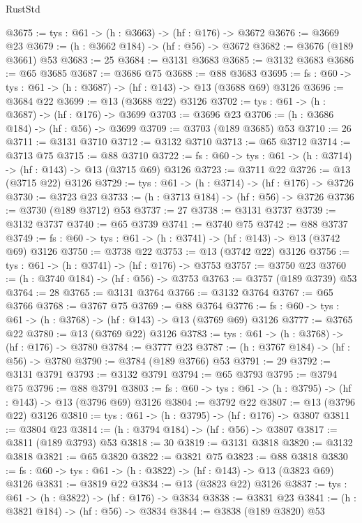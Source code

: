 \begin{lexlean}{RustStd}
\begin{coremodule}
@3675 := {tys : @61} -> (h : @3663) -> (hf : @176) -> @3672
@3676 := @3669 @23
@3679 := (h : @3662 @184) -> (hf : @56) -> @3672
@3682 := @3676 (@189 @3661) @53
@3683 := 25
@3684 := @3131 @3683
@3685 := @3132 @3683
@3686 := @65 @3685
@3687 := @3686 @75
@3688 := @88 @3683
@3695 := {fs : @60} -> {tys : @61} -> (h : @3687) -> (hf : @143) -> @13 (@3688 @69) @3126
@3696 := @3684 @22
@3699 := @13 (@3688 @22) @3126
@3702 := {tys : @61} -> (h : @3687) -> (hf : @176) -> @3699
@3703 := @3696 @23
@3706 := (h : @3686 @184) -> (hf : @56) -> @3699
@3709 := @3703 (@189 @3685) @53
@3710 := 26
@3711 := @3131 @3710
@3712 := @3132 @3710
@3713 := @65 @3712
@3714 := @3713 @75
@3715 := @88 @3710
@3722 := {fs : @60} -> {tys : @61} -> (h : @3714) -> (hf : @143) -> @13 (@3715 @69) @3126
@3723 := @3711 @22
@3726 := @13 (@3715 @22) @3126
@3729 := {tys : @61} -> (h : @3714) -> (hf : @176) -> @3726
@3730 := @3723 @23
@3733 := (h : @3713 @184) -> (hf : @56) -> @3726
@3736 := @3730 (@189 @3712) @53
@3737 := 27
@3738 := @3131 @3737
@3739 := @3132 @3737
@3740 := @65 @3739
@3741 := @3740 @75
@3742 := @88 @3737
@3749 := {fs : @60} -> {tys : @61} -> (h : @3741) -> (hf : @143) -> @13 (@3742 @69) @3126
@3750 := @3738 @22
@3753 := @13 (@3742 @22) @3126
@3756 := {tys : @61} -> (h : @3741) -> (hf : @176) -> @3753
@3757 := @3750 @23
@3760 := (h : @3740 @184) -> (hf : @56) -> @3753
@3763 := @3757 (@189 @3739) @53
@3764 := 28
@3765 := @3131 @3764
@3766 := @3132 @3764
@3767 := @65 @3766
@3768 := @3767 @75
@3769 := @88 @3764
@3776 := {fs : @60} -> {tys : @61} -> (h : @3768) -> (hf : @143) -> @13 (@3769 @69) @3126
@3777 := @3765 @22
@3780 := @13 (@3769 @22) @3126
@3783 := {tys : @61} -> (h : @3768) -> (hf : @176) -> @3780
@3784 := @3777 @23
@3787 := (h : @3767 @184) -> (hf : @56) -> @3780
@3790 := @3784 (@189 @3766) @53
@3791 := 29
@3792 := @3131 @3791
@3793 := @3132 @3791
@3794 := @65 @3793
@3795 := @3794 @75
@3796 := @88 @3791
@3803 := {fs : @60} -> {tys : @61} -> (h : @3795) -> (hf : @143) -> @13 (@3796 @69) @3126
@3804 := @3792 @22
@3807 := @13 (@3796 @22) @3126
@3810 := {tys : @61} -> (h : @3795) -> (hf : @176) -> @3807
@3811 := @3804 @23
@3814 := (h : @3794 @184) -> (hf : @56) -> @3807
@3817 := @3811 (@189 @3793) @53
@3818 := 30
@3819 := @3131 @3818
@3820 := @3132 @3818
@3821 := @65 @3820
@3822 := @3821 @75
@3823 := @88 @3818
@3830 := {fs : @60} -> {tys : @61} -> (h : @3822) -> (hf : @143) -> @13 (@3823 @69) @3126
@3831 := @3819 @22
@3834 := @13 (@3823 @22) @3126
@3837 := {tys : @61} -> (h : @3822) -> (hf : @176) -> @3834
@3838 := @3831 @23
@3841 := (h : @3821 @184) -> (hf : @56) -> @3834
@3844 := @3838 (@189 @3820) @53

\end{coremodule}
\end{lexlean}
